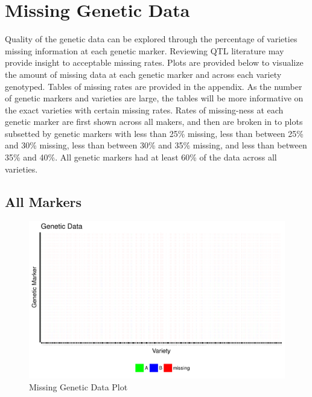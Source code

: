 \documentclass[11pt]{article}\usepackage[]{graphicx}\usepackage[]{color}
\makeatletter
\def\maxwidth{ %
  \ifdim\Gin@nat@width>\linewidth
    \linewidth
  \else
    \Gin@nat@width
  \fi
}
\newenvironment{knitrout}{}{} %
\makeatother
\begin{document}
\pagebreak
\section{Missing Genetic Data}
Quality of the genetic data can be explored through the percentage of varieties missing information at each genetic marker. Reviewing QTL literature may provide insight to acceptable missing rates. Plots are provided below to visualize the amount of missing data at each genetic marker and across each variety genotyped. Tables of missing rates are provided in the appendix. As the number of genetic markers and varieties are large, the tables will be more informative on the exact varieties with certain missing rates. Rates of missing-ness at each genetic marker are first shown across all makers, and then are broken in to plots subsetted by genetic markers with less than 25\% missing, less than between 25\% and 30\% missing, less than between 30\% and 35\% missing, and less than between 35\% and 40\%. All genetic markers had at least 60\% of the data across all varieties.

\subsection{All Markers}

\begin{knitrout}\footnotesize
{}\color{fgcolor}\begin{figure}[H]

{\centering \includegraphics[width=\maxwidth]{figure/missing_plot-1} 

}

\caption[Missing Genetic Data Plot]{Missing Genetic Data Plot}\label{fig:missing.plot}
\end{figure}


\end{knitrout}
\end{document}
